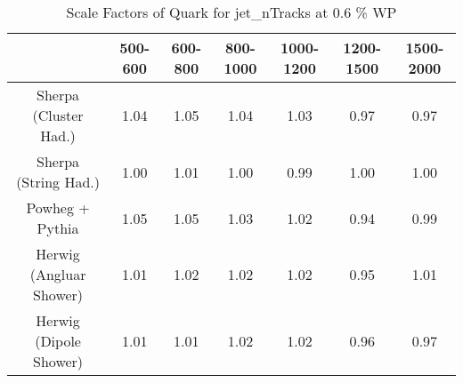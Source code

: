 \begin{table}
\centering
\caption{Scale Factors of Quark for jet_nTracks at 0.6 \% WP}
\label{tab:SF_MC_jet_nTracks_0.6_Quark}
\begin{tabular}{ccccccc}
\toprule
{} &  500-600 &  600-800 &  800-1000 &  1000-1200 &  1200-1500 &  1500-2000 \\
\midrule
Sherpa (Cluster Had.)   &     1.04 &     1.05 &      1.04 &       1.03 &       0.97 &       0.97 \\
Sherpa (String Had.)    &     1.00 &     1.01 &      1.00 &       0.99 &       1.00 &       1.00 \\
Powheg + Pythia         &     1.05 &     1.05 &      1.03 &       1.02 &       0.94 &       0.99 \\
Herwig (Angluar Shower) &     1.01 &     1.02 &      1.02 &       1.02 &       0.95 &       1.01 \\
Herwig (Dipole Shower)  &     1.01 &     1.01 &      1.02 &       1.02 &       0.96 &       0.97 \\
\bottomrule
\end{tabular}
\end{table}
